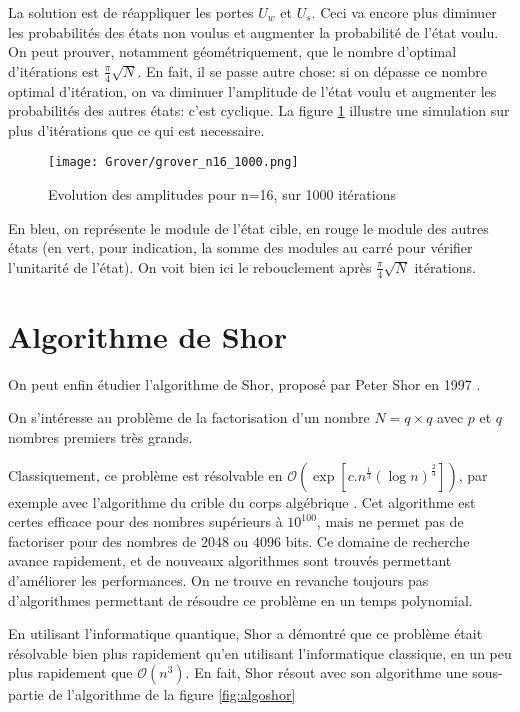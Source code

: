 La solution est de réappliquer les portes $U_w$ et $U_s$. Ceci va encore plus diminuer les probabilités des états non voulus et augmenter la probabilité de l'état voulu.
On peut prouver, notamment géométriquement, que le nombre d'optimal d'itérations est $\frac{\pi}{4}\sqrt{N}$. En fait, il se passe autre chose: si on dépasse ce nombre optimal d'itération, on va diminuer l'amplitude de l'état voulu et augmenter les probabilités des autres états: c'est cyclique. La figure \ref{fig:groverGraph} illustre une simulation sur plus d'itérations que ce qui est necessaire.

\begin{figure}[h]
  \centering
  \texttt{[image: Grover/grover\_n16\_1000.png]}
  \caption{Evolution des amplitudes pour n=16, sur 1000 itérations}
  \label{fig:groverGraph}
\end{figure}

En bleu, on représente le module de l'état cible, en rouge le module des autres états (en vert, pour indication, la somme des modules au carré pour vérifier l'unitarité de l'état). On voit bien ici le rebouclement après $\frac{\pi}{4}\sqrt{N}$ itérations.

\section{Algorithme de Shor}

On peut enfin étudier l'algorithme de Shor, proposé par Peter Shor en 1997 \cite{Shor97}.

\begin{pb}
  On s'intéresse au problème de la factorisation d'un nombre $N=q \times q$ avec $p$ et $q$ nombres premiers très grands.
\end{pb}

Classiquement, ce problème est résolvable en $\mathcal{O}(\exp{[c . n^{\frac{1}{3}} (\log n)^{\frac{2}{3}} ]})$, par exemple avec l'algorithme du crible du corps algébrique \cite{NFS-RSA220}. Cet algorithme est certes efficace pour des nombres supérieurs à $10^{100}$, mais ne permet pas de factoriser pour des nombres de $2048$ ou $4096$ bits. Ce domaine de recherche avance rapidement, et de nouveaux algorithmes sont trouvés permettant d'améliorer les performances. On ne trouve en revanche toujours pas d'algorithmes permettant de résoudre ce problème en un temps polynomial.

En utilisant l'informatique quantique, Shor a démontré que ce problème était résolvable bien plus rapidement qu'en utilisant l'informatique classique, en un peu plus rapidement que $\mathcal{O}(n^3)$. En fait, Shor résout avec son algorithme une sous-partie de l'algorithme de la figure \ref{fig:algoshor}

